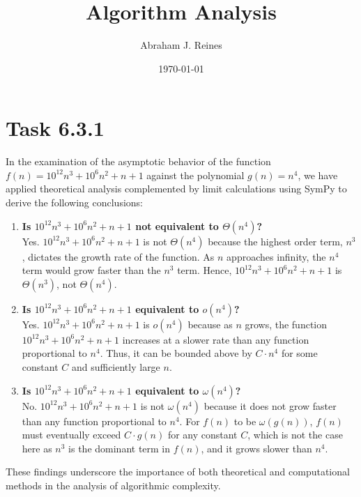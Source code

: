 \documentclass{article}
\title{Algorithm Analysis}
\author{Abraham J. Reines} %
\date{\today} %
\begin{document}
\maketitle

\section*{Task 6.3.1}

In the examination of the asymptotic behavior of the function $f(n) = 10^{12}n^3 + 10^6n^2 + n + 1$ against the polynomial $g(n) = n^4$, we have applied theoretical analysis complemented by limit calculations using SymPy to derive the following conclusions:

\begin{enumerate}
    \item \textbf{Is \( 10^{12}n^3 + 10^6n^2 + n + 1 \) not equivalent to \( \Theta(n^4) \)?}\\
    Yes. \( 10^{12}n^3 + 10^6n^2 + n + 1 \) is not \( \Theta(n^4) \) because the highest order term, \( n^3 \), dictates the growth rate of the function. As \( n \) approaches infinity, the \( n^4 \) term would grow faster than the \( n^3 \) term. Hence, \( 10^{12}n^3 + 10^6n^2 + n + 1 \) is \( \Theta(n^3) \), not \( \Theta(n^4) \).

    \item \textbf{Is \( 10^{12}n^3 + 10^6n^2 + n + 1 \) equivalent to \( o(n^4) \)?}\\
    Yes. \( 10^{12}n^3 + 10^6n^2 + n + 1 \) is \( o(n^4) \) because as \( n \) grows, the function \( 10^{12}n^3 + 10^6n^2 + n + 1 \) increases at a slower rate than any function proportional to \( n^4 \). Thus, it can be bounded above by \( C \cdot n^4 \) for some constant \( C \) and sufficiently large \( n \).

    \item \textbf{Is \( 10^{12}n^3 + 10^6n^2 + n + 1 \) equivalent to \( \omega(n^4) \)?}\\
    No. \( 10^{12}n^3 + 10^6n^2 + n + 1 \) is not \( \omega(n^4) \) because it does not grow faster than any function proportional to \( n^4 \). For \( f(n) \) to be \( \omega(g(n)) \), \( f(n) \) must eventually exceed \( C \cdot g(n) \) for any constant \( C \), which is not the case here as \( n^3 \) is the dominant term in \( f(n) \), and it grows slower than \( n^4 \).
\end{enumerate}

These findings underscore the importance of both theoretical and computational methods in the analysis of algorithmic complexity.
\end{document}
